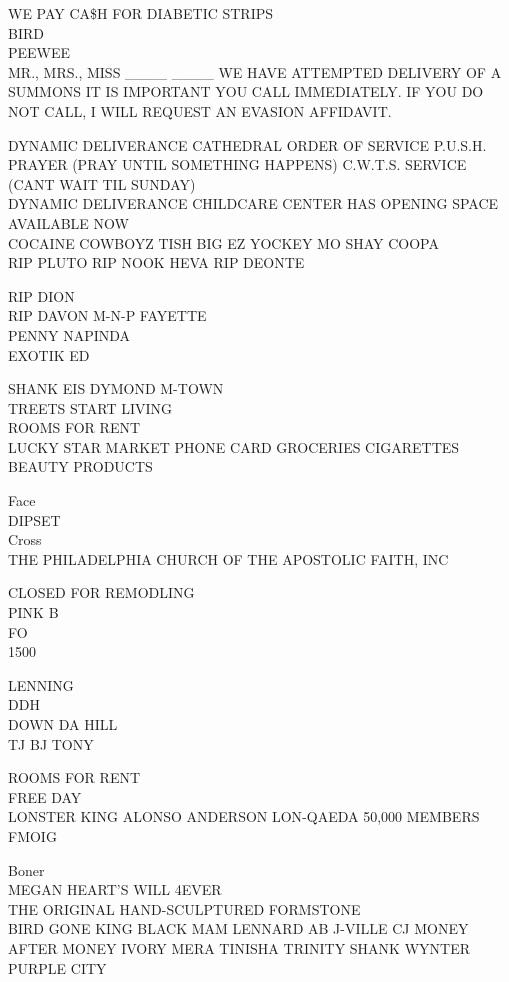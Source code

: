 \documentclass[10pt,letterpaper]{article}
\begin{document}
WE PAY CA\$H FOR DIABETIC STRIPS\\
BIRD\\
PEEWEE\\
MR., MRS., MISS \_\_\_\_ \_\_\_\_ WE HAVE ATTEMPTED DELIVERY OF A SUMMONS IT IS IMPORTANT YOU CALL IMMEDIATELY.  IF YOU DO NOT CALL, I WILL REQUEST AN EVASION AFFIDAVIT.

DYNAMIC DELIVERANCE CATHEDRAL ORDER OF SERVICE P.U.S.H. PRAYER (PRAY UNTIL SOMETHING HAPPENS) C.W.T.S. SERVICE (CANT WAIT TIL SUNDAY)\\
DYNAMIC DELIVERANCE CHILDCARE CENTER HAS OPENING  SPACE AVAILABLE NOW\\
COCAINE COWBOYZ TISH BIG EZ YOCKEY MO SHAY COOPA\\
RIP PLUTO RIP NOOK HEVA RIP DEONTE

RIP DION\\
RIP DAVON M{-}N{-}P FAYETTE\\
PENNY NAPINDA\\
EXOTIK ED

SHANK EIS DYMOND M{-}TOWN\\
TREETS START LIVING\\
ROOMS FOR RENT\\
LUCKY STAR MARKET PHONE CARD GROCERIES CIGARETTES BEAUTY PRODUCTS

Face\\
DIPSET\\
Cross\\
THE PHILADELPHIA CHURCH OF THE APOSTOLIC FAITH, INC

CLOSED FOR REMODLING\\
PINK B\\
FO\\
1500

LENNING\\
DDH\\
DOWN DA HILL\\
TJ BJ TONY

ROOMS FOR RENT\\
FREE DAY\\
LONSTER KING ALONSO ANDERSON LON{-}QAEDA 50,000 MEMBERS\\
FMOIG

Boner\\
MEGAN HEART'S WILL 4EVER\\
THE ORIGINAL HAND{-}SCULPTURED FORMSTONE\\
BIRD GONE KING BLACK MAM LENNARD AB J{-}VILLE CJ MONEY AFTER MONEY IVORY MERA TINISHA TRINITY SHANK WYNTER PURPLE CITY
\end{document}
